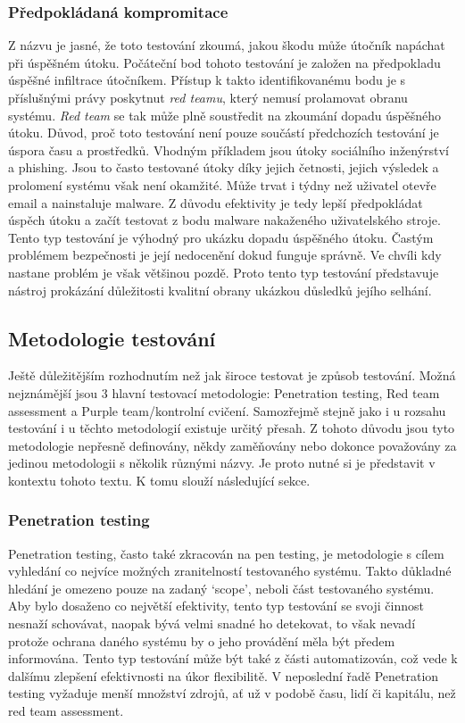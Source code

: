 \subsubsection{Předpokládaná kompromitace}
Z názvu je jasné, že toto testování zkoumá, jakou škodu může útočník napáchat při úspěšném útoku.
Počáteční bod tohoto testování je založen na předpokladu úspěšné infiltrace útočníkem.
Přístup k takto identifikovanému bodu je s příslušnými právy poskytnut \textit{red teamu}, který nemusí prolamovat obranu systému.
\textit{Red team} se tak může plně soustředit na zkoumání dopadu úspěšného útoku.
Důvod, proč toto testování není pouze součástí předchozích testování je úspora času a prostředků.
Vhodným příkladem jsou útoky sociálního inženýrství a phishing.
Jsou to často testované útoky díky jejich četnosti, jejich výsledek a prolomení systému však není okamžité.
Může trvat i týdny než uživatel otevře email a nainstaluje malware.\cite{red_team_oakley_2019}
Z důvodu efektivity je tedy lepší předpokládat úspěch útoku a začít testovat z bodu malware nakaženého uživatelského stroje.
Tento typ testování je výhodný pro ukázku dopadu úspěšného útoku.
Častým problémem bezpečnosti je její nedocenění dokud funguje správně.
Ve chvíli kdy nastane problém je však většinou pozdě.
Proto tento typ testování představuje nástroj prokázání důležitosti kvalitní obrany ukázkou důsledků jejího selhání.

\subsection{Metodologie testování}\label{subsec:metodologie-testovani}
Ještě důležitějším rozhodnutím než jak široce testovat je způsob testování.
Možná nejznámější jsou 3 hlavní testovací metodologie: Penetration testing, Red team assessment a Purple team/kontrolní cvičení.
Samozřejmě stejně jako i u rozsahu testování i u těchto metodologií existuje určitý přesah.
Z tohoto důvodu jsou tyto metodologie nepřesně definovány, někdy zaměňovány nebo dokonce považovány za jedinou metodologii s několik různými názvy.
Je proto nutné si je představit v kontextu tohoto textu.
K tomu slouží následující sekce.\cite{securityInteligence_pen_test_red_team_purple_team}

\subsubsection{Penetration testing}

Penetration testing, často také zkracován na pen testing, je metodologie s cílem vyhledání co nejvíce možných zranitelností testovaného systému.
Takto důkladné hledání je omezeno pouze na zadaný `scope', neboli část testovaného systému.
Aby bylo dosaženo co největší efektivity, tento typ testování se svoji činnost nesnaží schovávat, naopak bývá velmi snadné ho detekovat, to však nevadí protože ochrana daného systému by o jeho provádění měla být předem informována.
Tento typ testování může být také z části automatizován, což vede k dalšímu zlepšení efektivnosti na úkor flexibilitě.
V neposlední řadě Penetration testing vyžaduje menší množství zdrojů, ať už v podobě času, lidí či kapitálu, než red team assessment.
